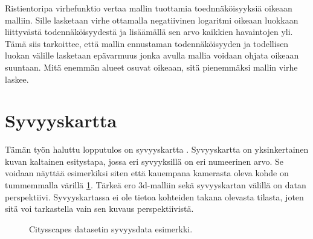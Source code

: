 Ristientoripa virhefunktio vertaa mallin tuottamia toednnäköisyyksiä oikeaan malliin. 
Sille lasketaan virhe ottamalla negatiivinen logaritmi oikeaan luokkaan liittyvästä todennäköisyydestä ja lisäämällä sen arvo kaikkien havaintojen yli.
Tämä siis tarkoittee, että mallin ennustaman todennäköisyyden ja todellisen luokan välille lasketaan epävarmuus jonka avulla mallia voidaan ohjata oikeaan suuntaan.
Mitä enemmän alueet osuvat oikeaan, sitä pienemmäksi mallin virhe laskee.

\section{Syvyyskartta}

Tämän työn haluttu lopputulos on syvyyskartta \cite{IkeuchiKatsushi1987DaDM}.
Syvyyskartta on yksinkertainen kuvan kaltainen esitystapa, jossa eri syvyyksillä on eri numeerinen arvo.
Se voidaan näyttää esimerkiksi siten että kauempana kamerasta oleva kohde on tummemmalla värillä \ref{fig:depth}.
Tärkeä ero 3d-malliin sekä syvyyskartan välillä on datan perspektiivi.
Syvyyskartassa ei ole tietoa kohteiden takana olevasta tilasta, joten sitä voi tarkastella vain sen kuvaus perspektiivistä.


\begin{figure}[h]
\centering
{}
\caption[Tämä on lyhyt kuvateksti.]{Citysscapes datasetin syvyysdata esimerkki.}
\label{fig:depth}
\end{figure}
